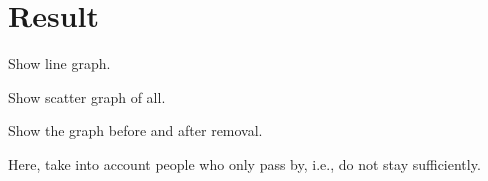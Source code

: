\documentclass{article}
\begin{document}


\section{Result} %
\label{sec:result}
Show line graph.

Show scatter graph of all.

Show the graph before and after removal.

Here, take into account people who only pass by, i.e., do not stay sufficiently.

{}

\end{document}
